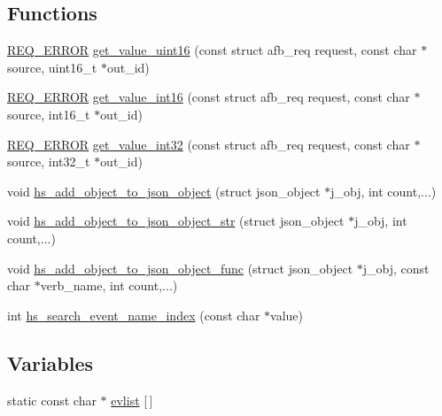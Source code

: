 \subsection*{Functions}
\begin{DoxyCompactItemize}
\item 
\hyperlink{hs-helper_8h_aa49f1dbbf26f01627a5737cf43aad899}{R\+E\+Q\+\_\+\+E\+R\+R\+OR} \hyperlink{hs-helper_8h_a649900645417f2df3a70b9ad67529f53}{get\+\_\+value\+\_\+uint16} (const struct afb\+\_\+req request, const char $\ast$source, uint16\+\_\+t $\ast$out\+\_\+id)
\item 
\hyperlink{hs-helper_8h_aa49f1dbbf26f01627a5737cf43aad899}{R\+E\+Q\+\_\+\+E\+R\+R\+OR} \hyperlink{hs-helper_8h_a2e62366684e39ea94436bf017e416827}{get\+\_\+value\+\_\+int16} (const struct afb\+\_\+req request, const char $\ast$source, int16\+\_\+t $\ast$out\+\_\+id)
\item 
\hyperlink{hs-helper_8h_aa49f1dbbf26f01627a5737cf43aad899}{R\+E\+Q\+\_\+\+E\+R\+R\+OR} \hyperlink{hs-helper_8h_ac5b0370643c520377afd3fd4891918d2}{get\+\_\+value\+\_\+int32} (const struct afb\+\_\+req request, const char $\ast$source, int32\+\_\+t $\ast$out\+\_\+id)
\item 
void \hyperlink{hs-helper_8h_a1ba31a6a94515ff1730ba0043a67d59e}{hs\+\_\+add\+\_\+object\+\_\+to\+\_\+json\+\_\+object} (struct json\+\_\+object $\ast$j\+\_\+obj, int count,...)
\item 
void \hyperlink{hs-helper_8h_a8777c53f1d4d5412f19b134ad85ffedf}{hs\+\_\+add\+\_\+object\+\_\+to\+\_\+json\+\_\+object\+\_\+str} (struct json\+\_\+object $\ast$j\+\_\+obj, int count,...)
\item 
void \hyperlink{hs-helper_8h_ae83604a37134e7bdee3ce4f10bb0b47a}{hs\+\_\+add\+\_\+object\+\_\+to\+\_\+json\+\_\+object\+\_\+func} (struct json\+\_\+object $\ast$j\+\_\+obj, const char $\ast$verb\+\_\+name, int count,...)
\item 
int \hyperlink{hs-helper_8h_a2ff1b894941c3b461ca8119079c4146a}{hs\+\_\+search\+\_\+event\+\_\+name\+\_\+index} (const char $\ast$value)
\end{DoxyCompactItemize}
\subsection*{Variables}
\begin{DoxyCompactItemize}
\item 
static const char $\ast$ \hyperlink{hs-helper_8h_a0cd84b1a2184c9b84d1b7bf24582f28e}{evlist} \mbox{[}$\,$\mbox{]}
\end{DoxyCompactItemize}


